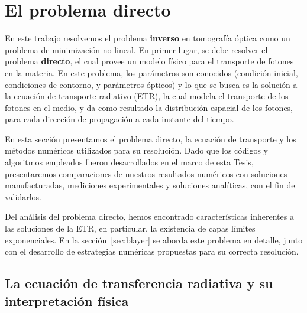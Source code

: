 \pagestyle{fancy}
\chapter{El problema directo}
\label{cap:forw}
\lhead{\thepage}
\pagebreak

En este trabajo resolvemos el problema {\bf inverso} 
en tomografía óptica como un problema de minimización no lineal. 
En primer lugar, se debe resolver el problema {\bf directo}, 
el cual provee un modelo 
 físico para el transporte de fotones en la materia. En este problema, los parámetros 
son conocidos (condición inicial, condiciones de contorno, 
y parámetros ópticos) y lo que se busca es la solución a la ecuación de transporte radiativo (ETR), la cual modela 
el transporte de los fotones en el medio, y da como resultado la distribución 
espacial de los fotones, para cada dirección de propagación a cada instante del tiempo. 

En esta sección presentamos el problema directo, 
la ecuación de transporte y los métodos numéricos utilizados para su resolución. 
Dado que los códigos y algoritmos empleados 
fueron desarrollados en el marco de esta Tesis, presentaremos 
comparaciones de nuestros resultados numéricos  con soluciones manufacturadas, 
mediciones experimentales y soluciones analíticas, con el fin de validarlos.

Del análisis del problema directo, hemos encontrado características inherentes 
a las soluciones de la ETR, en particular, la existencia de capas límites exponenciales.
En la sección~\ref{sec:blayer} se aborda este problema en detalle, 
junto con el desarrollo de estrategias numéricas propuestas para su correcta 
resolución. 


\section{La ecuación de transferencia radiativa y su interpretación física}
\label{sec:ETR}

